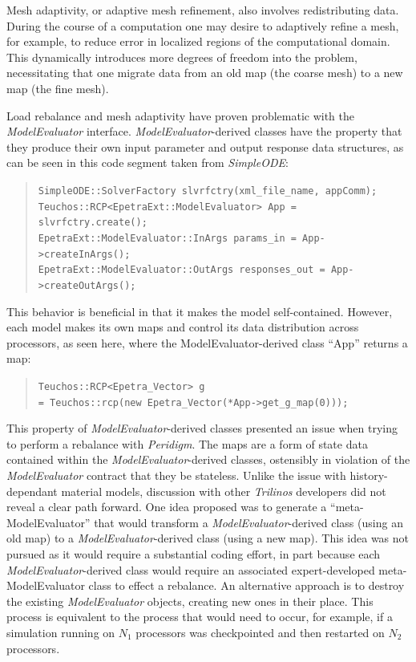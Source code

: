 \documentclass[pdf,ps2pdf,12pt,report]{SANDreport}
\theoremstyle{plain}
\theoremstyle{definition}
\theoremstyle{remark}
\numberwithin{equation}{section}
\begin{document}
Mesh adaptivity, or adaptive mesh refinement, also involves redistributing data. During the course of a computation one may desire to adaptively refine a mesh, for example, to reduce error in localized regions of the computational domain. This dynamically introduces more degrees of freedom into the problem, necessitating that one migrate data from an old map (the coarse mesh) to a new map (the fine mesh).

Load rebalance and mesh adaptivity have proven problematic with the \emph{ModelEvaluator} interface. \emph{ModelEvaluator}-derived classes have the property that they produce their own input parameter and output response data structures, as can be seen in this code segment taken from \emph{SimpleODE}:
\begin{quote}
\vspace{-5pt}
\verb"SimpleODE::SolverFactory slvrfctry(xml_file_name, appComm);"\\
\verb"Teuchos::RCP<EpetraExt::ModelEvaluator> App = slvrfctry.create();"\\
\verb"EpetraExt::ModelEvaluator::InArgs params_in = App->createInArgs();"\\
\verb"EpetraExt::ModelEvaluator::OutArgs responses_out = App->createOutArgs();"\\
\vspace{-17pt}
\end{quote}
This behavior is beneficial in that it makes the model self-contained. However, each model makes its own maps and control its data distribution across processors, as seen here, where the ModelEvaluator-derived class ``App'' returns a map:
\begin{quote}
\vspace{-5pt}
\verb"Teuchos::RCP<Epetra_Vector> g"\\
\verb"= Teuchos::rcp(new Epetra_Vector(*App->get_g_map(0)));"\\
\vspace{-17pt}
\end{quote}
This property of \emph{ModelEvaluator}-derived classes presented an issue when trying to perform a rebalance with \emph{Peridigm}. The maps are a form of state data contained within the \emph{ModelEvaluator}-derived classes, ostensibly in violation of the \emph{ModelEvaluator} contract that they be stateless. Unlike the issue with history-dependant material models, discussion with other \emph{Trilinos} developers did not reveal a clear path forward. One idea proposed was to generate a ``meta-ModelEvaluator'' that would transform a \emph{ModelEvaluator}-derived class (using an old map) to a \emph{ModelEvaluator}-derived class (using a new map). This idea was not pursued as it would require a substantial coding effort, in part because each \emph{ModelEvaluator}-derived class would require an associated expert-developed meta-ModelEvaluator class to effect a rebalance. An alternative approach is to destroy the existing \emph{ModelEvaluator} objects, creating new ones in their place. This process is equivalent to the process that would need to occur, for example, if a simulation running on $N_1$ processors was checkpointed and then restarted on $N_2$ processors.
\end{document}
